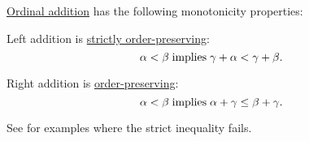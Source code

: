 \begin{proposition}\label{thm:ordinal_addition_is_monotone}
  \hyperref[def:ordinal_arithmetic/addition]{Ordinal addition} has the following monotonicity properties:
  \begin{thmenum}
     Left addition is \hyperref[eq:def:order_homomorphism/increasing/strict]{strictly order-preserving}:
    \begin{equation}\label{eq:thm:ordinal_addition_is_monotone/left}
      \alpha < \beta \T{implies} \gamma + \alpha < \gamma + \beta.
    \end{equation}

     Right addition is \hyperref[def:order_homomorphism/increasing]{order-preserving}:
    \begin{equation}\label{eq:thm:ordinal_addition_is_monotone/right}
      \alpha < \beta \T{implies} \alpha + \gamma \leq \beta + \gamma.
    \end{equation}

    See  for examples where the strict inequality fails.
  \end{thmenum}
\end{proposition}
